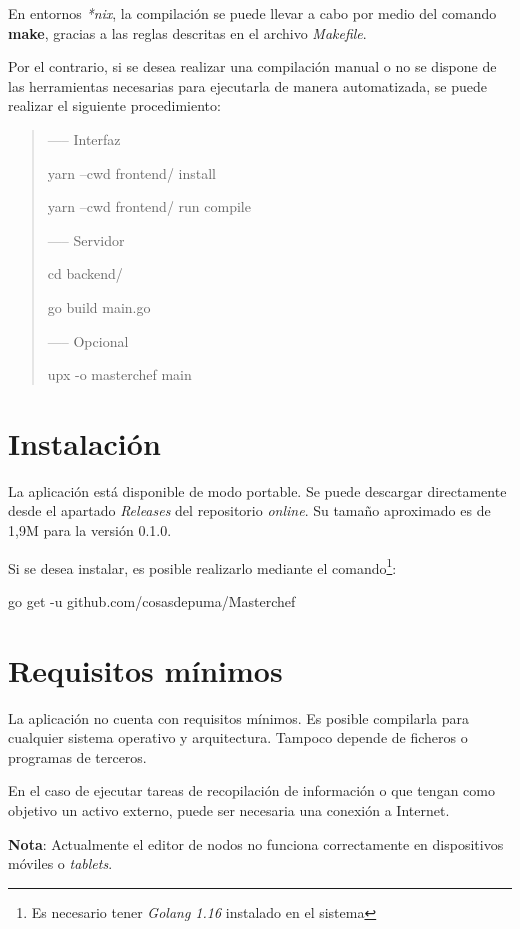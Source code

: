 En entornos \textit{*nix}, la compilación se puede llevar a cabo por medio del comando \textbf{make}, gracias a las reglas descritas en el archivo \textit{Makefile}.\sn

Por el contrario, si se desea realizar una compilación manual o no se dispone de las herramientas necesarias para ejecutarla de manera automatizada, se puede realizar el siguiente procedimiento:\sn

\begin{quote}
----- Interfaz

yarn --cwd frontend/ install

yarn --cwd frontend/ run compile

----- Servidor

cd backend/

go build main.go

----- Opcional

upx -o masterchef main\n
\end{quote}

\section{Instalación} \label{sec:installation}

La aplicación está disponible de modo portable. Se puede descargar directamente desde el apartado \textit{Releases} del repositorio \textit{online}. Su tamaño aproximado es de 1,9M para la versión 0.1.0.\sn

Si se desea instalar, es posible realizarlo mediante el comando\footnote{Es necesario tener \textit{Golang 1.16} instalado en el sistema}:\sn

\hfil go get -u github.com/cosasdepuma/Masterchef \hfil\n

\section{Requisitos mínimos} \label{sec:minimumrequirements}

La aplicación no cuenta con requisitos mínimos. Es posible compilarla para cualquier sistema operativo y arquitectura. Tampoco depende de ficheros o programas de terceros.\sn

En el caso de ejecutar tareas de recopilación de información o que tengan como objetivo un activo externo, puede ser necesaria una conexión a Internet.\sn

\textbf{Nota}: Actualmente el editor de nodos no funciona correctamente en dispositivos móviles o \textit{tablets}.\n

